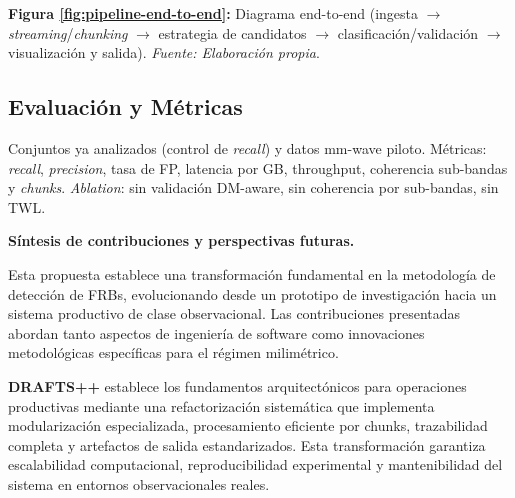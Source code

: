 \begin{center}
\end{center}

\vspace{0.5cm}
\noindent\textbf{Figura \ref{fig:pipeline-end-to-end}:} Diagrama end-to-end (ingesta $\to$ \emph{streaming}/\emph{chunking} $\to$ estrategia de candidatos $\to$ clasificación/validación $\to$ visualización y salida). \textit{Fuente: Elaboración propia}.

\label{fig:pipeline-end-to-end}

\subsection{Evaluación y Métricas}

Conjuntos ya analizados (control de \emph{recall}) y datos mm-wave piloto. Métricas: \emph{recall}, \emph{precision}, tasa de FP, latencia por GB, throughput, coherencia sub-bandas y \emph{chunks}. \emph{Ablation}: sin validación DM-aware, sin coherencia por sub-bandas, sin TWL.

\medskip\noindent \textbf{Síntesis de contribuciones y perspectivas futuras.} 

Esta propuesta establece una transformación fundamental en la metodología de detección de FRBs, evolucionando desde un prototipo de investigación hacia un sistema productivo de clase observacional. Las contribuciones presentadas abordan tanto aspectos de ingeniería de software como innovaciones metodológicas específicas para el régimen milimétrico.

\textbf{DRAFTS++} establece los fundamentos arquitectónicos para operaciones productivas mediante una refactorización sistemática que implementa modularización especializada, procesamiento eficiente por chunks, trazabilidad completa y artefactos de salida estandarizados. Esta transformación garantiza escalabilidad computacional, reproducibilidad experimental y mantenibilidad del sistema en entornos observacionales reales.

